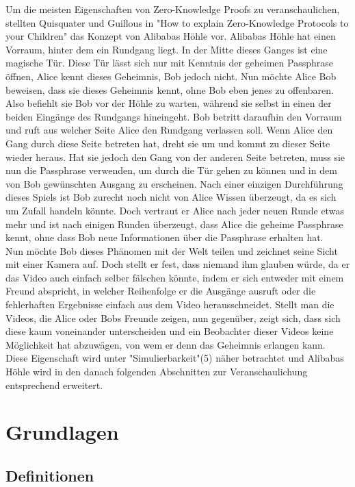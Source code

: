 \documentclass {article}
\begin{document}
Um die meisten Eigenschaften von Zero-Knowledge Proofs zu veranschaulichen, stellten Quisquater und Guillous in "How to explain Zero-Knowledge Protocols to your Children"\cite{GQ89} das Konzept von Alibabas H\"ohle vor.
Alibabas H\"ohle hat einen Vorraum, hinter dem ein Rundgang liegt. In der Mitte dieses Ganges ist eine magische T\"ur. Diese T\"ur l\"asst sich nur mit Kenntnis der geheimen Passphrase \"offnen,
Alice kennt dieses Geheimnis, Bob jedoch nicht.
Nun m\"ochte Alice Bob beweisen, dass sie dieses Geheimnis kennt, ohne Bob eben jenes zu offenbaren. Also befiehlt sie Bob vor der H\"ohle zu warten, w\"ahrend sie selbst in einen der beiden Eing\"ange des Rundgangs hineingeht. Bob betritt daraufhin den Vorraum und ruft aus welcher Seite Alice den Rundgang verlassen soll. Wenn Alice den Gang durch diese Seite betreten hat, dreht sie um und kommt zu dieser Seite wieder heraus. Hat sie jedoch den Gang von der anderen Seite betreten, muss sie nun die Passphrase verwenden, um durch die T\"ur gehen zu k\"onnen und in dem von Bob gewünschten Ausgang zu erscheinen. Nach einer einzigen Durchf\"uhrung dieses Spiels ist Bob zurecht noch nicht von Alice Wissen \"uberzeugt, da es sich um Zufall handeln k\"onnte. Doch vertraut er Alice nach jeder neuen Runde etwas mehr und ist nach einigen Runden \"uberzeugt, dass Alice die geheime Passphrase kennt, ohne dass Bob neue Informationen \"uber die Passphrase erhalten hat. \\ 

Nun m\"ochte Bob dieses Ph\"anomen mit der Welt teilen und zeichnet seine Sicht mit einer Kamera auf. Doch stellt er fest, dass niemand ihm glauben würde, da er das Video auch einfach selber f\"alschen k\"onnte, indem er sich entweder mit einem Freund abspricht, in welcher Reihenfolge er die Ausg\"ange ausruft oder die fehlerhaften Ergebnisse einfach aus dem Video herausschneidet. 
Stellt man die Videos, die Alice oder Bobs Freunde zeigen, nun gegen\"uber, zeigt sich, dass sich diese kaum voneinander unterscheiden und ein Beobachter dieser Videos keine M\"oglichkeit hat abzuw\"agen, von wem er denn das Geheimnis erlangen kann.
Diese Eigenschaft wird unter "Simulierbarkeit"(5) n\"aher betrachtet und Alibabas H\"ohle wird in den danach folgenden Abschnitten zur Veranschaulichung entsprechend erweitert.


\section{Grundlagen}
\subsection{Definitionen}
\end{document}
